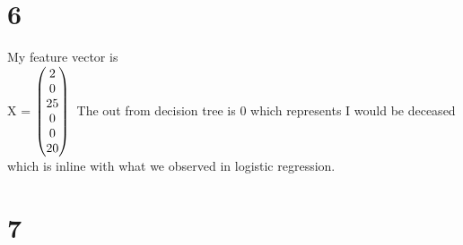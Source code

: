 \documentclass{article}
\begin{document}
\section{6}
My feature vector is \\
X = 
$
\begin{pmatrix}
    2 \\
    0 \\
    25 \\
    0 \\
    0 \\
    20
\end{pmatrix} \\
$
The out from decision tree is 0 which represents I would be deceased which is inline with what we observed in logistic regression.

\section{7}
\end{document}
